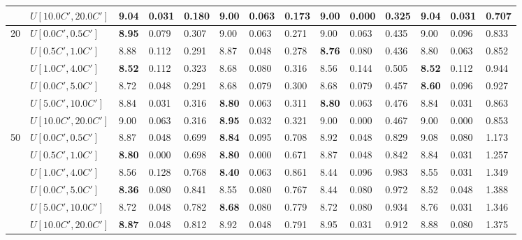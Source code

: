\begin{table}[h]
{\begin{tabular}{|l|l||l|l|l||l|l|l||l|l|l||l|l|l|}
       & $U[10.0C',20.0C']$ & 9.04 & 0.031 & 0.180 & \textbf{9.00} & 0.063 & 0.173 & \textbf{9.00} & 0.000 & 0.325 & 9.04 & 0.031 & 0.707 \\
      \hline\hline
      \multirow{6}{*}{20} & $U[0.0C',0.5C']$ & \textbf{8.95} & 0.079 & 0.307 & 9.00 & 0.063 & 0.271 & 9.00 & 0.063 & 0.435 & 9.00 & 0.096 & 0.833 \\
       & $U[0.5C',1.0C']$ & 8.88 & 0.112 & 0.291 & 8.87 & 0.048 & 0.278 & \textbf{8.76} & 0.080 & 0.436 & 8.80 & 0.063 & 0.852 \\
       & $U[1.0C',4.0C']$ & \textbf{8.52} & 0.112 & 0.323 & 8.68 & 0.080 & 0.316 & 8.56 & 0.144 & 0.505 & \textbf{8.52} & 0.112 & 0.944 \\
       & $U[0.0C',5.0C']$ & 8.72 & 0.048 & 0.291 & 8.68 & 0.079 & 0.300 & 8.68 & 0.079 & 0.457 & \textbf{8.60} & 0.096 & 0.927 \\
       & $U[5.0C',10.0C']$ & 8.84 & 0.031 & 0.316 & \textbf{8.80} & 0.063 & 0.311 & \textbf{8.80} & 0.063 & 0.476 & 8.84 & 0.031 & 0.863 \\
       & $U[10.0C',20.0C']$ & 9.00 & 0.063 & 0.316 & \textbf{8.95} & 0.032 & 0.321 & 9.00 & 0.000 & 0.467 & 9.00 & 0.000 & 0.853 \\
      \hline\hline
      \multirow{6}{*}{50} & $U[0.0C',0.5C']$ & 8.87 & 0.048 & 0.699 & \textbf{8.84} & 0.095 & 0.708 & 8.92 & 0.048 & 0.829 & 9.08 & 0.080 & 1.173 \\
       & $U[0.5C',1.0C']$ & \textbf{8.80} & 0.000 & 0.698 & \textbf{8.80} & 0.000 & 0.671 & 8.87 & 0.048 & 0.842 & 8.84 & 0.031 & 1.257 \\
       & $U[1.0C',4.0C']$ & 8.56 & 0.128 & 0.768 & \textbf{8.40} & 0.063 & 0.861 & 8.44 & 0.096 & 0.983 & 8.55 & 0.031 & 1.349 \\
       & $U[0.0C',5.0C']$ & \textbf{8.36} & 0.080 & 0.841 & 8.55 & 0.080 & 0.767 & 8.44 & 0.080 & 0.972 & 8.52 & 0.048 & 1.388 \\
       & $U[5.0C',10.0C']$ & 8.72 & 0.048 & 0.782 & \textbf{8.68} & 0.080 & 0.779 & 8.72 & 0.080 & 0.934 & 8.76 & 0.031 & 1.346 \\
       & $U[10.0C',20.0C']$ & \textbf{8.87} & 0.048 & 0.812 & 8.92 & 0.048 & 0.791 & 8.95 & 0.031 & 0.912 & 8.88 & 0.080 & 1.375 \\
      \hline
      \end{tabular}
      }
      \label{tab:pcpn90p6}\end{table}

